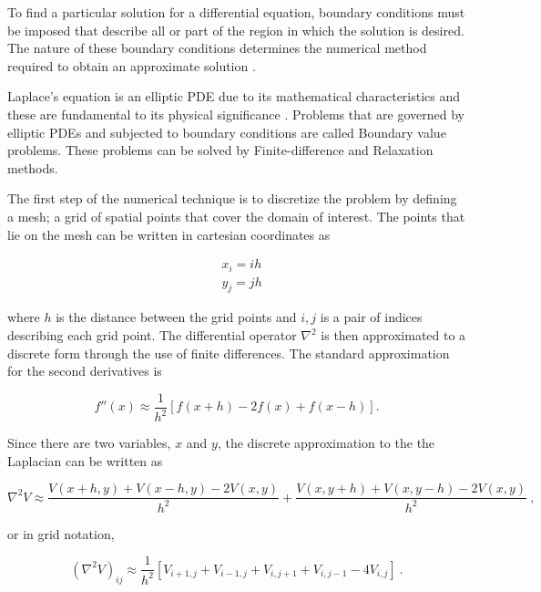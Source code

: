 \documentclass[a4paper]{jpconf}
\begin{document}
To find a particular solution for a differential equation, boundary conditions must be imposed that describe all or part of the region in which the solution is desired. The nature of these boundary conditions determines the numerical method required to obtain an approximate solution \cite{Cheney.Kincai-NumericalMethods}. \par
Laplace's equation is an elliptic PDE due to its mathematical characteristics and these are fundamental to its physical significance \cite{RHB-MathematicalMethods}. Problems that are governed by elliptic PDEs and subjected to boundary conditions are called Boundary value problems.
These problems can be solved by Finite-difference and Relaxation methods. \par

The first step of the numerical technique is to discretize the problem by defining a mesh; a grid of  spatial points that cover the domain of interest. The points that lie on the mesh can be written in cartesian coordinates as 

\begin{subequations}
\begin{align}
&x_i = ih\\ 
&y_j = jh
\end{align}
\label{eq:coord}
\end{subequations} 

\noindent where $h$ is the distance between the grid points and $i,j$ is a pair of indices describing each grid point. The differential operator $\nabla^2$ is then approximated 
to a discrete form through the use of finite differences. The standard approximation for the second derivatives is \cite{Cheney.Kincai-NumericalMethods} 

\begin{equation}
f''(x) \approx \frac{1}{h^2}[f(x+h) - 2f(x) + f(x-h)].
\end{equation}

\noindent Since there are two variables, $x$ and $y$, the discrete approximation to the the Laplacian can be written as

\begin{equation}
\nabla^2 V \approx \frac{V(x+h,y) + V(x-h,y) - 2V(x,y)}{h^2} + \frac{V(x,y+h) + V(x,y-h) - 2V(x,y)}{h^2}~,
\end{equation}

\noindent or in grid notation,

\begin{equation}
(\nabla^2 V)_{ij} \approx \frac{1}{h^2}[V_{i+1,j} + V_{i-1,j} + V_{i,j+1} + V_{i,j-1} - 4V_{i,j}]~.
\label{eq:fivepoint}
\end{equation}
\end{document}
